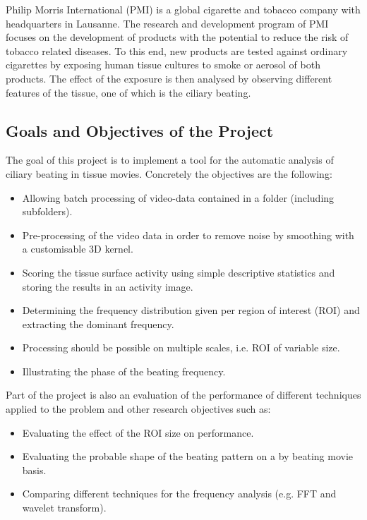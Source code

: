\documentclass[11pt]{scrartcl}
\begin{document}
Philip Morris International (PMI) is a global cigarette and tobacco company with headquarters in Lausanne. The
research and development program of PMI focuses on the development of products with the potential to reduce
the risk of tobacco related diseases. To this end, new products are tested against ordinary cigarettes by
exposing human tissue cultures to smoke or aerosol of both products. The effect of the exposure is then
analysed by observing different features of the tissue, one of which is the ciliary beating.


\subsection{Goals and Objectives of the Project}

The goal of this project is to implement a tool for the automatic analysis of ciliary beating in tissue
movies. Concretely the objectives are the following:
\begin{itemize}
\item Allowing batch processing of video-data contained in a folder (including subfolders). 
\item Pre-processing of the video data in order to remove noise by smoothing with a customisable 3D kernel.
\item Scoring the tissue surface activity using simple descriptive statistics and storing the results in an
  activity image.
\item Determining the frequency distribution given per region of interest (ROI) and extracting the
  dominant frequency.
\item Processing should be possible on multiple scales, i.e. ROI of variable size. 
\item Illustrating the phase of the beating frequency.
\end{itemize}

Part of the project is also an evaluation of the performance of different techniques applied to the
problem and other research objectives such as:

\begin{itemize}
\item Evaluating the effect of the ROI size on performance.
\item Evaluating the probable shape of the beating pattern on a by beating movie basis.
\item Comparing different techniques for the frequency analysis (e.g. FFT and wavelet transform).
\end{itemize}
\end{document}

